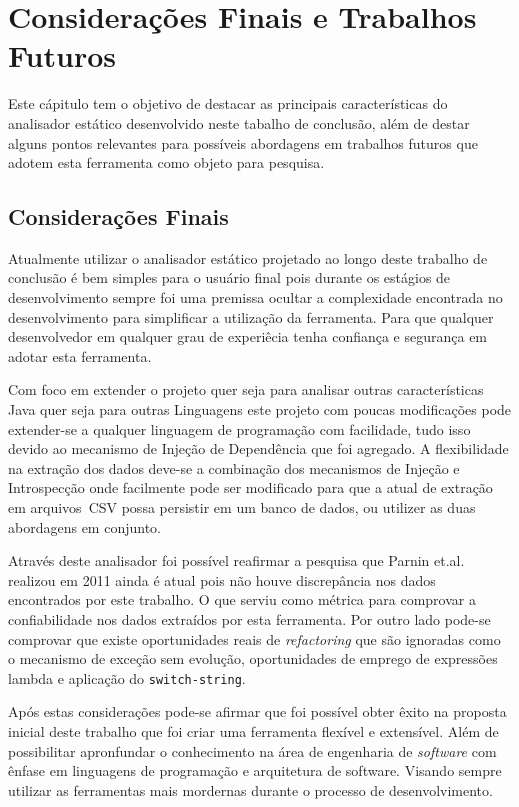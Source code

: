 \chapter{Considerações Finais e Trabalhos Futuros}
Este c\'{a}pitulo tem o objetivo de destacar as principais caracter\'{i}sticas do analisador est\'{a}tico desenvolvido neste tabalho de conclus\~{a}o, al\'{e}m de destar alguns pontos relevantes para poss\'{i}veis abordagens em trabalhos futuros que adotem esta ferramenta como objeto para pesquisa.

\section{Considerações Finais}
Atualmente utilizar o analisador est\'{a}tico projetado ao longo deste trabalho de conclus\~{a}o \'{e} bem simples para o usu\'{a}rio final pois durante os est\'{a}gios de desenvolvimento sempre foi uma premissa ocultar a complexidade encontrada no desenvolvimento para simplificar a utiliza\c{c}\~{a}o da ferramenta. Para que qualquer desenvolvedor em qualquer grau de experi\^{e}cia tenha confian\c{c}a e seguran\c{c}a em adotar esta ferramenta.

Com foco em extender o projeto quer seja para analisar outras caracter\'{i}sticas Java quer seja para outras Linguagens este projeto com poucas modifica\c{c}\~{o}es pode extender-se a qualquer linguagem de programa\c{c}\~{a}o com facilidade, tudo isso devido ao mecanismo de Injeção de Dependência  que foi agregado. A flexibilidade na extra\c{c}\~{a}o dos dados deve-se a combina\c{c}\~{a}o dos mecanismos de Inje\c{c}\~{a}o e Introspec\c{c}\~{a}o onde facilmente pode ser modificado para que a atual de extra\c{c}\~{a}o em arquivos~\acs{CSV} possa persistir em um banco de dados, ou utilizer as duas abordagens em conjunto.

Atrav\'{e}s deste analisador foi poss\'{i}vel reafirmar a pesquisa que Parnin et.al.~\cite{Parnin:ACM2011} realizou em \num{2011} ainda \'{e} atual pois n\~{a}o houve discrep\^{a}ncia nos dados encontrados por este trabalho. O que serviu como m\'{e}trica para comprovar a confiabilidade nos dados extra\'{i}dos por esta ferramenta. Por outro lado pode-se comprovar que existe oportunidades reais de \textit{refactoring} que s\~{a}o ignoradas como o mecanismo de exce\c{c}\~{a}o sem evolu\c{c}\~{a}o, oportunidades de emprego de express\~{o}es lambda e aplica\c{c}\~{a}o do \texttt{switch-string}.

Ap\'{o}s estas considera\c{c}\~{o}es pode-se afirmar que foi poss\'{i}vel obter \^{e}xito na proposta inicial deste trabalho que foi criar uma ferramenta flex\'{i}vel e extens\'{i}vel. Al\'{e}m  de possibilitar apronfundar o conhecimento na \'{a}rea de engenharia de \textit{software} com \^{e}nfase em linguagens de programa\c{c}\~{a}o e arquitetura de software. Visando sempre utilizar as ferramentas mais mordernas durante o processo de desenvolvimento.



